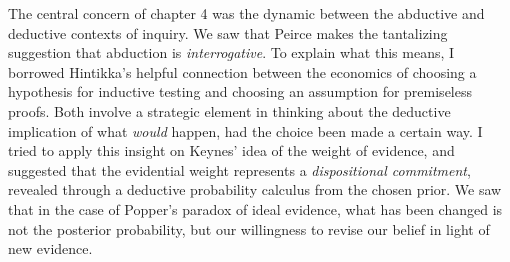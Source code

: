 The central concern of chapter 4 was the dynamic between the abductive and deductive contexts of inquiry. We saw that Peirce makes the tantalizing suggestion that abduction is \emph{interrogative}. To explain what this means, I borrowed Hintikka's helpful connection between the economics of choosing a hypothesis for inductive testing and choosing an assumption for premiseless proofs. Both involve a strategic element in thinking about the deductive implication of what \emph{would} happen, had the choice been made a certain way. I tried to apply this insight on Keynes' idea of the weight of evidence, and suggested that the evidential weight represents a \emph{dispositional commitment}, revealed through a deductive probability calculus from the chosen prior. We saw that in the case of Popper's paradox of ideal evidence, what has been changed is not the posterior probability, but our willingness to revise our belief in light of new evidence.  

